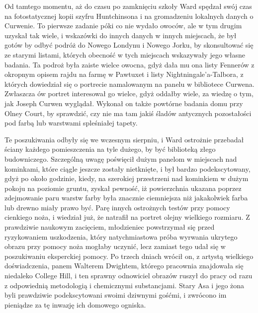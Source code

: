Od tamtego momentu, aż do czasu po zamknięciu szkoły Ward spędzał swój czas na fotostatycznej kopii szyfru Huntchinsona i na gromadzeniu lokalnych danych o Curwenie. To pierwsze zadanie póki co nie wydało owoców, ale w tym drugim uzyskał tak wiele, i wskazówki do innych danych w innych miejscach, że był gotów by odbyć podróż do Nowego Londynu i Nowego Jorku, by skonsultować się ze starymi listami, których obecność w tych miejscach wskazywały jego własne badania. Ta podroż była zaiste wielce owocna, gdyż dała mu ona listy Fennerów z okropnym opisem rajdu na farmę w Pawtuxet i listy Nightningale'a-Talbora, z których dowiedział się o portrecie namalowanym na panelu w bibliotece Curwena. Zwłaszcza ów portret interesował go wielce, gdyż oddałby wiele, za wiedzę o tym, jak Joseph Curwen wyglądał. Wykonał on także powtórne badania domu przy Olney Court, by sprawdzić, czy nie ma tam jakiś śladów antycznych pozostałości pod farbą lub warstwami spleśniałej tapety. 

Te poszukiwania odbyły się we wczesnym sierpniu, i Ward ostrożnie przebadał ściany każdego pomieszczenia na tyle dużego, by być biblioteką złego budowniczego. Szczególną uwagę poświęcił dużym panelom w miejscach nad kominkami, które ciągle jeszcze zostały nietknięte, i był bardzo podekscytowany, gdyż po około godzinie, kiedy, na szerokiej przestrzeni nad kominkiem w dużym pokoju na poziomie gruntu, zyskał pewność, iż powierzchnia ukazana poprzez zdejmowanie paru warstw farby była znacznie ciemniejsza niż jakakolwiek farba lub drewno miały prawo być. Parę innych ostrożnych testów przy pomocy cienkiego noża, i wiedział już, że natrafił na portret olejny wielkiego rozmiaru. Z prawdziwie naukowym zacięciem, młodzieniec powstrzymał się przed ryzykowaniem uszkodzenia, który natychmiastowa próba wyrwania ukrytego obrazu przy pomocy noża mogłaby uczynić, lecz zamiast tego udał się w poszukiwaniu eksperckiej pomocy. Po trzech dniach wrócił on, z artystą wielkiego doświadczenia, panem Walterem Dwightem,  którego pracownia znajdowała się niedaleko College Hill, i ten sprawny odnowiciel obrazów ruszył do pracy od razu z odpowiednią metodologią i chemicznymi substancjami. Stary Asa i jego żona byli prawdziwie podekscytowani swoimi dziwnymi gośćmi, i zwrócono im pieniądze za tę inwazję ich domowego ogniska.

